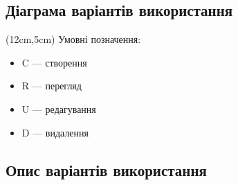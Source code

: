 \subsection{Діаграма варіантів використання}

\begin{flushright}
 \begin{textblock*}{5cm}(12cm,5cm)
  \footnotesize Умовні позначення:
   \begin{itemize}
    \item C --- створення
    \item R --- перегляд
    \item U --- редагування
    \item D --- видалення
   \end{itemize}
 \end{textblock*}
\end{flushright}

\scalebox{0.31}{}

\newpage

\subsection{Опис варіантів використання}

\newcommand{\rowspan}[2]{
 \multirow{1}{*}[
  \dimexpr#1 / 2\relax
 ]{#2}
}

\newlength{\spanHeight}
\newbox\tmpparbox

